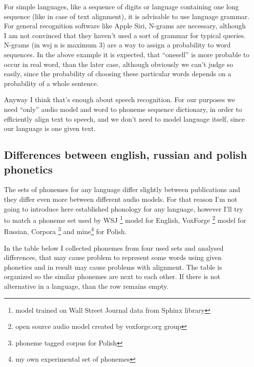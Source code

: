 \documentclass[12pt,a4paper,english]{article}
\begin{document}
For simple languages, like a sequence of digits or language containing one long sequence (like in case of text alignment), it is advisable to use language grammar. \newline
For general recognition software like Apple Siri, N-grams are necessary, although I am not convinced that they haven't used a sort of grammar for typical queries. \newline
N-grams (in wsj n is maximum 3) are a way to assign a probability to word sequences. In the above example it is expected, that “oneself” is more probable to occur in real word, than the later case, although obviously we can't judge so easily, since the probability of choosing these particular words depends on a probability of a whole sentence. \newline

Anyway I think that's enough about speech recognition. \newline
For our purposes we need “only” audio model and word to phoneme sequence dictionary, in order to efficiently align text to speech, and we don't need to model language itself, since our language is one given text. \newline

\newpage
\subsection{Differences between english, russian and polish phonetics}

The sets of phonemes for any language differ slightly between publications and they differ even more between different audio models. For that reason I'm not going to introduce here established phonology for any language, however I'll try to match a phoneme set used by WSJ \footnote{model trained on Wall Street Journal data from Sphinx library} model for English, VoxForge \footnote{open source audio model created by voxforge.org group} model for Russian, Corpora \footnote{phoneme tagged corpus for Polish} and mine\footnote{my own experimental set of phonemes} for Polish. \newline

In the table below I collected phonemes from four used sets and analysed differences, that may cause problem to represent some words using given phonetics and in result may cause problems with alignment. The table is organized so the similar phonemes are next to each other. If there is not alternative in a language, than the row remains empty. \newline
\end{document}
